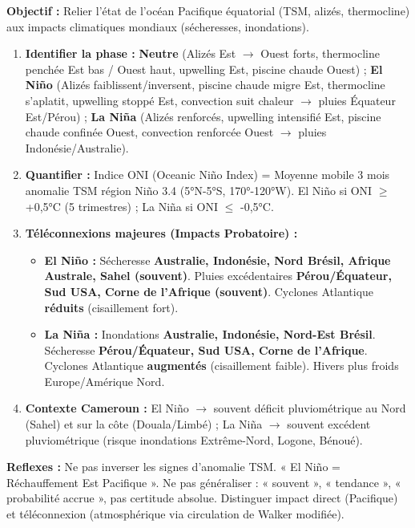 \documentclass[11pt]{article}
\newcommand{\cle}[1]{{\popxbold\color{popdark}#1}}
\begin{document}
\begin{methode}
\textbf{Objectif :} Relier l'état de l'océan Pacifique équatorial (TSM, alizés, thermocline) aux impacts climatiques mondiaux (sécheresses, inondations).
\begin{enumerate}
    \item \textbf{Identifier la phase :} \textbf{Neutre} (Alizés Est $\to$ Ouest forts, thermocline penchée Est bas / Ouest haut, upwelling Est, piscine chaude Ouest) ; \textbf{El Niño} (Alizés faiblissent/inversent, piscine chaude migre Est, thermocline s'aplatit, upwelling stoppé Est, convection suit chaleur $\to$ pluies Équateur Est/Pérou) ; \textbf{La Niña} (Alizés renforcés, upwelling intensifié Est, piscine chaude confinée Ouest, convection renforcée Ouest $\to$ pluies Indonésie/Australie).
    \item \textbf{Quantifier :} Indice \cle{ONI} (Oceanic Niño Index) = Moyenne mobile 3 mois anomalie TSM région Niño 3.4 (5°N-5°S, 170°-120°W). El Niño si ONI $\ge$ +0,5°C (5 trimestres) ; La Niña si ONI $\le$ -0,5°C.
    \item \textbf{Téléconnexions majeures (Impacts Probatoire) :}
    \begin{itemize}
        \item \textbf{El Niño :} Sécheresse \textbf{Australie, Indonésie, Nord Brésil, Afrique Australe, Sahel (souvent)}. Pluies excédentaires \textbf{Pérou/Équateur, Sud USA, Corne de l'Afrique (souvent)}. Cyclones Atlantique \textbf{réduits} (cisaillement fort).
        \item \textbf{La Niña :} Inondations \textbf{Australie, Indonésie, Nord-Est Brésil}. Sécheresse \textbf{Pérou/Équateur, Sud USA, Corne de l'Afrique}. Cyclones Atlantique \textbf{augmentés} (cisaillement faible). Hivers plus froids Europe/Amérique Nord.
    \end{itemize}
    \item \textbf{Contexte Cameroun :} El Niño $\to$ souvent déficit pluviométrique au Nord (Sahel) et sur la côte (Douala/Limbé) ; La Niña $\to$ souvent excédent pluviométrique (risque inondations Extrême-Nord, Logone, Bénoué).
\end{enumerate}
\textbf{Reflexes :} Ne pas inverser les signes d'anomalie TSM. « El Niño = Réchauffement Est Pacifique ». Ne pas généraliser : « souvent », « tendance », « probabilité accrue », pas certitude absolue. Distinguer impact direct (Pacifique) et téléconnexion (atmosphérique via circulation de Walker modifiée).
\end{methode}
\end{document}
